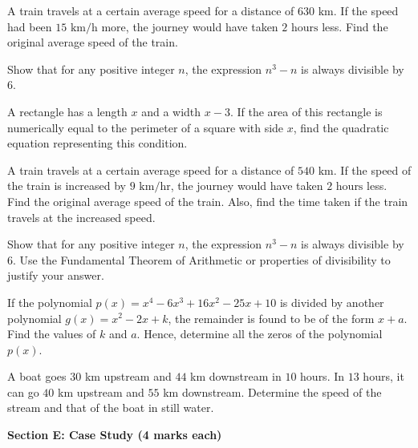 \documentclass[12pt,a4paper]{exam}
\begin{document}
\begin{questions}
\question[4] A train travels at a certain average speed for a distance of $630 \text{ km}$. If the speed had been $15 \text{ km/h}$ more, the journey would have taken $2 \text{ hours}$ less. Find the original average speed of the train.
\vspace{0.15cm}

\question[4] Show that for any positive integer $n$, the expression $n^3 - n$ is always divisible by $6$.
\vspace{0.15cm}

\question[4] A rectangle has a length $x$ and a width $x-3$. If the area of this rectangle is numerically equal to the perimeter of a square with side $x$, find the quadratic equation representing this condition.
\vspace{0.15cm}

\question[4] A train travels at a certain average speed for a distance of $540 \text{ km}$. If the speed of the train is increased by $9 \text{ km/hr}$, the journey would have taken $2 \text{ hours}$ less. Find the original average speed of the train. Also, find the time taken if the train travels at the increased speed.
\vspace{0.15cm}

\question[4] Show that for any positive integer $n$, the expression $n^3 - n$ is always divisible by $6$. Use the Fundamental Theorem of Arithmetic or properties of divisibility to justify your answer.
\vspace{0.15cm}

\question[4] If the polynomial $p(x) = x^4 - 6x^3 + 16x^2 - 25x + 10$ is divided by another polynomial $g(x) = x^2 - 2x + k$, the remainder is found to be of the form $x + a$. Find the values of $k$ and $a$. Hence, determine all the zeros of the polynomial $p(x)$.
\vspace{0.15cm}

\question[4] A boat goes $30$ km upstream and $44$ km downstream in $10$ hours. In $13$ hours, it can go $40$ km upstream and $55$ km downstream. Determine the speed of the stream and that of the boat in still water.
\vspace{0.15cm}

\end{questions}
\bigskip
\noindent\textbf{\large Section E: Case Study (4 marks each)}
\end{document}
